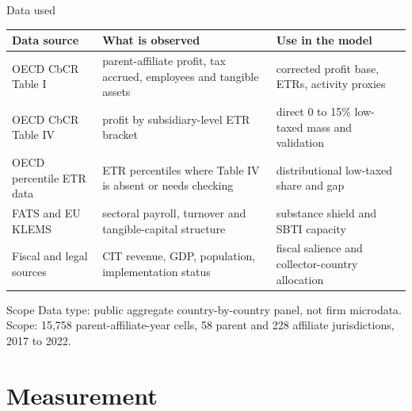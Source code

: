 \documentclass[aspectratio=169, 11pt]{beamer}
\begin{document}
\begin{frame}{Data used}
\small
\begin{center}
\scriptsize
\begin{tabular}{@{}L{3.35cm}L{4.15cm}L{3.85cm}@{}}
  \toprule
  Data source & What is observed & Use in the model \\
  \midrule
  OECD CbCR Table I & parent-affiliate profit, tax accrued, employees and tangible assets & corrected profit base, ETRs, activity proxies \\
  OECD CbCR Table IV & profit by subsidiary-level ETR bracket & direct 0 to 15\% low-taxed mass and validation \\
  OECD percentile ETR data & ETR percentiles where Table IV is absent or needs checking & distributional low-taxed share and gap \\
  FATS and EU KLEMS & sectoral payroll, turnover and tangible-capital structure & substance shield and SBTI capacity \\
  Fiscal and legal sources & CIT revenue, GDP, population, implementation status & fiscal salience and collector-country allocation \\
  \bottomrule
\end{tabular}
\end{center}

\vspace{0.3em}
\begin{block}{Scope}
  \footnotesize Data type: public aggregate country-by-country panel, not firm microdata. \\ Scope: 15,758 parent-affiliate-year cells, 58 parent and 228 affiliate jurisdictions, 2017 to 2022.
\end{block}
\end{frame}

\section{Measurement}
\end{document}
